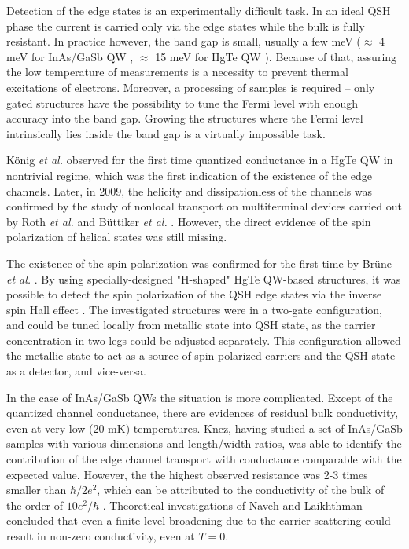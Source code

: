 \documentclass[titlepage,a4paper]{book}
\begin{document}
Detection of the edge states is an experimentally difficult task. In an ideal QSH phase the current is carried only via the edge states while the bulk is fully resistant. In practice however, the band gap is small, usually a few meV ($\approx$ 4 meV for InAs/GaSb QW \cite{Altarelli_BandStructure}\cite{Yang_BandStructure}, $\approx$ 15 meV for HgTe QW \cite{Konig_Topology}). Because of that, assuring the low temperature of measurements is a necessity to prevent thermal excitations of electrons. Moreover, a processing of samples is required -- only gated structures have the possibility to tune the Fermi level with enough accuracy into the band gap. Growing the structures where the Fermi level intrinsically lies inside the band gap is a virtually impossible task.

König \textit{et al.} \cite{Konig_Topology} observed for the first time quantized conductance in a HgTe QW in nontrivial regime, which was the first indication of the existence of the edge channels. Later, in 2009, the helicity and dissipationless of the channels was confirmed by the study of nonlocal transport on multiterminal devices carried out by Roth \textit{et al.} \cite{Roth_State} and Büttiker \textit{et al.} \cite{Buttiker_State}. However, the direct evidence of the spin polarization of helical states was still missing. 

The existence of the spin polarization was confirmed for the first time by Brüne \textit{et al.} \cite{Brune_State}. By using specially-designed "H-shaped" HgTe QW-based structures, it was possible to detect the spin polarization of the QSH edge states via the inverse spin Hall effect \cite{Hankiewicz_State}\cite{Valenzuela_State}. The investigated structures were in a two-gate configuration, and could be tuned locally from metallic state into QSH state, as the carrier concentration in two legs could be adjusted separately. This configuration allowed the metallic state to act as a source of spin-polarized carriers and the QSH state as a detector, and vice-versa. 

In the case of InAs/GaSb QWs the situation is more complicated. Except of the quantized channel conductance, there are evidences of residual bulk conductivity, even at very low (20 mK) temperatures. Knez, having studied a set of InAs/GaSb samples with various dimensions and length/width ratios, was able to identify the contribution of the edge channel transport with conductance comparable with the expected value. However, the the highest observed resistance was 2-3 times smaller than $\hbar/2e^2$, which can be attributed to the conductivity of the bulk of the order of $10 e^2/ \hbar$ \cite{Knez1_State}. Theoretical investigations of Naveh and Laikhthman \cite{Naveh_State} concluded that even a finite-level broadening due to the carrier scattering could result in non-zero conductivity, even at $T = 0$.  
\end{document}
